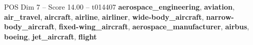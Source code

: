 \begin{textsample}{POS Dim 7 – Score 14.00 – t014407}  \label{ex:f7_pos_040}
\textbf{aerospace\_engineering}, \textbf{aviation}, \textbf{air\_travel}, \textbf{aircraft}, \textbf{airline}, \textbf{airliner}, \textbf{wide-body\_aircraft}, \textbf{narrow-body\_aircraft}, \textbf{fixed-wing\_aircraft}, \textbf{aerospace\_manufacturer}, \textbf{airbus}, \textbf{boeing}, \textbf{jet\_aircraft}, \textbf{flight}

\end{textsample}
